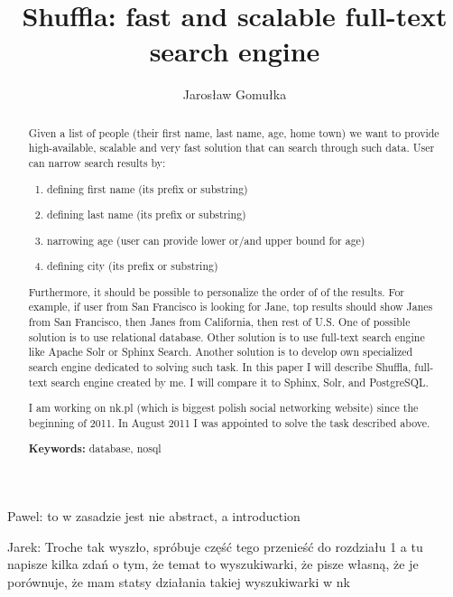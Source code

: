 \documentclass[10pt,a4paper]{article}
\newcommand{\pawel}[1]{\noindent\colorbox{myRed}{Pawel: #1}}
\newcommand{\jarek}[1]{\noindent\colorbox{myYellow}{Jarek: #1}}
\begin{document}
\title{Shuffla: fast and scalable full-text search engine}
\author{Jarosław Gomułka}

\maketitle

\pawel{to w zasadzie jest nie abstract, a introduction}

\jarek{Troche tak wyszło, spróbuje część tego przenieść do rozdziału 1 a tu napisze kilka zdań o tym, że temat to wyszukiwarki, że pisze własną, że je porównuje, że mam statsy działania takiej wyszukiwarki w nk} 

\begin{abstract}
Given a list of people (their first name, last name, age, home town) we want to provide high-available, scalable and very fast solution that can search through such data.
User can narrow search results by:

\bigskip
\begin{enumerate}
\item{defining first name (its prefix or substring)}
\item{defining last name (its prefix or substring)}
\item{narrowing age (user can provide lower or/and upper bound for age)}
\item{defining city (its prefix or substring)}
\end{enumerate}

\bigskip
Furthermore, it should be possible to personalize the order of of the results. For example, if user from San Francisco is looking for Jane, top results should show Janes from San Francisco, then Janes from California, then rest of U.S. One of possible solution is to use relational database. Other solution is to use full-text search engine like Apache Solr or Sphinx Search. Another solution is to develop own specialized search engine dedicated to solving such task. In this paper I will describe Shuffla, full-text search engine created by me. I will compare it to Sphinx, Solr, and PostgreSQL. 

\bigskip
I am working on nk.pl (which is biggest polish social networking website) since the beginning of 2011. In August 2011 I was appointed to solve the task described above. 

\bigskip
\noindent \textbf{Keywords:} database, nosql
\end{abstract}

\end{document}
